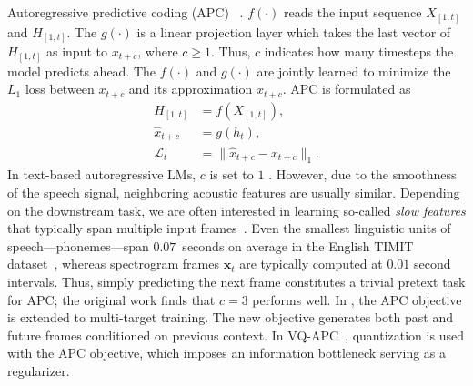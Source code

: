 Autoregressive predictive coding (APC)~\cite{chung2019unsupervised,
chung2020generative} .
 $f(\cdot)$ reads the input sequence $X_{[1,t]}$ and  $H_{[1,t]}$.
The  $g(\cdot)$ is a linear projection layer which takes the last vector of $H_{[1,t]}$ as input to  $x_{t+c}$, where $c \geq 1$. Thus, $c$ indicates how many timesteps the model predicts ahead. The  $f(\cdot)$
and $g(\cdot)$ are jointly learned to minimize {the \ensuremath{L_1} loss between $x_{t+c}$ and its approximation $\hat{x}_{t+c}$}. APC is formulated as 
\begin{align}
    H_{[1,t]} &= f(X_{[1,t]}) , \\
    \hat{x}_{t+c} &= g(h_{t}) \label{eq:c} , \\
    \mathcal{L}_t &= \lVert \hat{x}_{t+c} - x_{t+c} \rVert_1 .
\end{align}
In text-based autoregressive LMs, $c$ is set to $1$ . However, due to the smoothness of the speech signal, neighboring acoustic features are usually similar. Depending on the downstream task, we are often interested in learning so-called \emph{slow features} that typically span multiple input frames~\cite{wiskott2002slow}. Even the smallest linguistic units of speech---phonemes---span $0.07$~seconds on average in the English TIMIT dataset~\cite{garofolo_timit_1993},   whereas spectrogram frames $\mathbf{x}_t$ are typically computed at $0.01$ second intervals. Thus, simply predicting the next frame constitutes a trivial pretext task for APC; the original work finds that $c=3$ performs well. 
In \cite{chung2020improved}, the APC objective is extended to multi-target
training. The new objective generates both past and future frames conditioned
on previous context. 
In VQ-APC~\cite{chung20e_interspeech}, quantization is used with the APC
objective, which imposes an information bottleneck serving as a regularizer.

